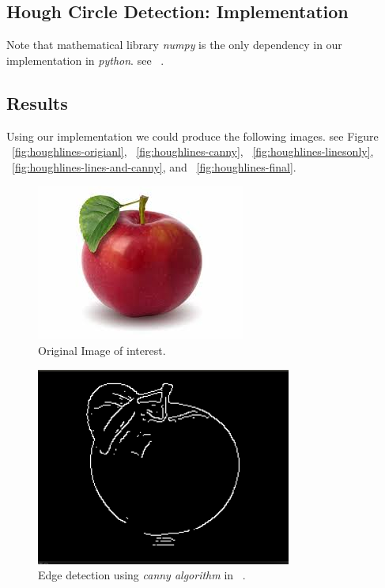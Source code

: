 \documentclass[letterpaper, 12 pt, conference ,onecolumn]{ieeeconf}  %
\begin{document}
\subsection*{Hough Circle Detection: Implementation }
Note that mathematical library \textit{numpy} is the only dependency in our implementation in \textit{python}. see ~.

\subsection*{Results}
Using our implementation we could produce the following images. see Figure ~\ref{fig:houghlines-origianl}, ~\ref{fig:houghlines-canny}, ~\ref{fig:houghlines-linesonly}, ~\ref{fig:houghlines-lines-and-canny}, and ~\ref{fig:houghlines-final}.

\begin{figure}[h!]
\includegraphics[width=0.4\paperwidth]{hough-circles/Apple2.jpg}
\caption{Original Image of interest.}
\label{fig:apple2}
\end{figure}

\begin{figure}[h!]
\includegraphics[width=0.4\paperwidth]{hough-circles/apple2-canny.png}
\caption{Edge detection using \textit{canny algorithm} in ~.}
\label{fig:apple2-canny}
\end{figure}
\end{document}
